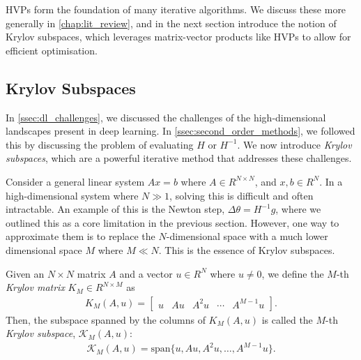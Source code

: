 HVPs form the foundation of many iterative algorithms. We discuss these more generally in \cref{chap:lit_review}, and in the next section introduce the notion of Krylov subspaces, which leverages matrix-vector products like HVPs to allow for efficient optimisation.

\subsection{Krylov Subspaces}
\label{ssec:krylov_subspaces}

In \cref{ssec:dl_challenges}, we discussed the challenges of the high-dimensional landscapes present in deep learning. In \cref{ssec:second_order_methods}, we followed this by discussing the problem of evaluating $H$ or $H^{-1}$. We now introduce \textit{Krylov subspaces}, which are a powerful iterative method that addresses these challenges.

Consider a general linear system $Ax = b$ where $A \in R^{N \times N}$, and $x, b \in R^{N}$. In a high-dimensional system where $N \gg 1$, solving this is difficult and often intractable. An example of this is the Newton step, $\Delta \theta = H^{-1} g$, where we outlined this as a core limitation in the previous section. However, one way to approximate them is to replace the $N$-dimensional space with a much lower dimensional space $M$ where $M \ll N$. This is the essence of Krylov subspaces.

\begin{definition}
    Given an $N \times N$ matrix $A$ and a vector $u \in R^N$ where $u \neq 0$, we define the $M$-th \textit{Krylov matrix} $K_M \in R^{N \times M}$ as
    \begin{align}
        K_M(A, u) = \begin{bmatrix} u & A u & A^2 u & \cdots & A^{M-1} u \end{bmatrix}.
        \label{eq:krylov_matrix}
    \end{align}
    Then, the subspace spanned by the columns of $K_M(A, u)$ is called the $M$-th \textit{Krylov subspace}, $\mathcal{K}_M(A, u)$:
    \begin{align}
        \mathcal{K}_M(A, u) = \text{span} \{u, A u, A^2 u, \ldots, A^{M-1} u \}.
    \end{align}
\end{definition}

